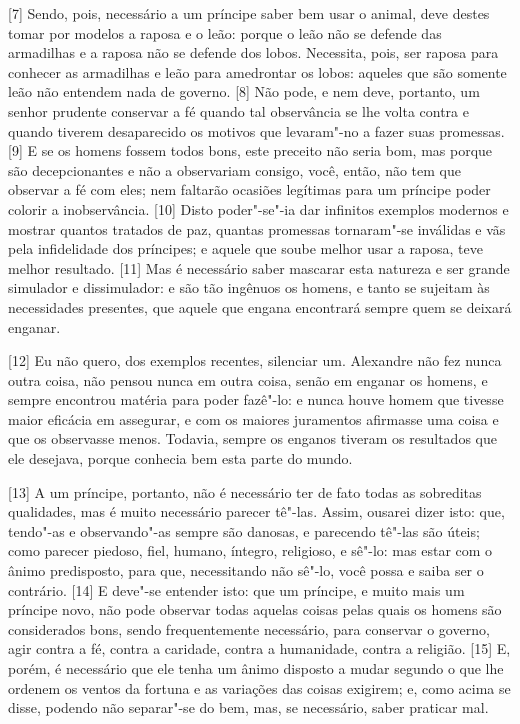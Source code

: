 {[}7{]} Sendo, pois, necessário a um príncipe saber bem usar o animal,
deve destes tomar por modelos a raposa e o leão: porque o leão não se
defende das armadilhas e a raposa não se defende dos lobos. Necessita,
pois, ser raposa para conhecer as armadilhas e leão para amedrontar os
lobos: aqueles que são somente leão não entendem nada de governo.
{[}8{]} Não pode, e nem deve, portanto, um senhor prudente conservar a
fé quando tal observância se lhe volta contra e quando tiverem
desaparecido os motivos que levaram"-no a fazer suas promessas. {[}9{]} E
se os homens fossem todos bons, este preceito não seria bom, mas porque
são decepcionantes e não a observariam consigo, você, então, não tem que
observar a fé com eles; nem faltarão ocasiões legítimas para um príncipe
poder colorir a inobservância. {[}10{]} Disto poder"-se"-ia dar infinitos
exemplos modernos e mostrar quantos tratados de paz, quantas promessas
tornaram"-se inválidas e vãs pela infidelidade dos príncipes; e aquele
que soube melhor usar a raposa, teve melhor resultado. {[}11{]} Mas é
necessário saber mascarar esta natureza e ser grande simulador e
dissimulador: e são tão ingênuos os homens, e tanto se sujeitam às
necessidades presentes, que aquele que engana encontrará sempre quem se
deixará enganar.

{[}12{]} Eu não quero, dos exemplos recentes, silenciar um. Alexandre 
não fez nunca outra coisa, não pensou nunca em outra coisa, senão em
enganar os homens, e sempre encontrou matéria para poder fazê"-lo: e
nunca houve homem que tivesse maior eficácia em assegurar, e com os
maiores juramentos afirmasse uma coisa e que os observasse menos.
Todavia, sempre os enganos tiveram os resultados que ele desejava,
porque conhecia bem esta parte do mundo.

{[}13{]} A um príncipe, portanto, não é necessário ter de fato todas as
sobreditas qualidades, mas é muito necessário parecer tê"-las. Assim,
ousarei dizer isto: que, tendo"-as e observando"-as sempre são danosas, e
parecendo tê"-las são úteis; como parecer piedoso, fiel, humano, íntegro,
religioso, e sê"-lo: mas estar com o ânimo predisposto, para que,
necessitando não sê"-lo, você possa e saiba ser o contrário. {[}14{]} E
deve"-se entender isto: que um príncipe, e muito mais um príncipe novo,
não pode observar todas aquelas coisas pelas quais os homens são
considerados bons, sendo frequentemente necessário, para conservar o
governo, agir contra a fé, contra a caridade, contra a humanidade,
contra a religião. {[}15{]} E, porém, é necessário que ele tenha um
ânimo disposto a mudar segundo o que lhe ordenem os ventos da fortuna e
as variações das coisas exigirem; e, como acima se disse, podendo não
separar"-se do bem, mas, se necessário, saber praticar mal.

